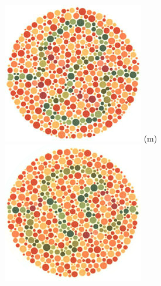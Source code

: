\documentclass[	12pt, Times, openright, twoside, a4paper, english, brazil]{abntex2}
\begin{document}
\begin{apendicesenv}
\begin{figure}[!htb]
\endminipage\hfill
{}
\centering
{\includegraphics[width=\linewidth]{ishihara-fuga/plate34.jpg}}
(m)
\endminipage\hfill
{}
\centering
{\includegraphics[width=\linewidth]{ishihara-fuga/plate35.jpg}}

\end{figure}
\end{apendicesenv}
\end{document}
